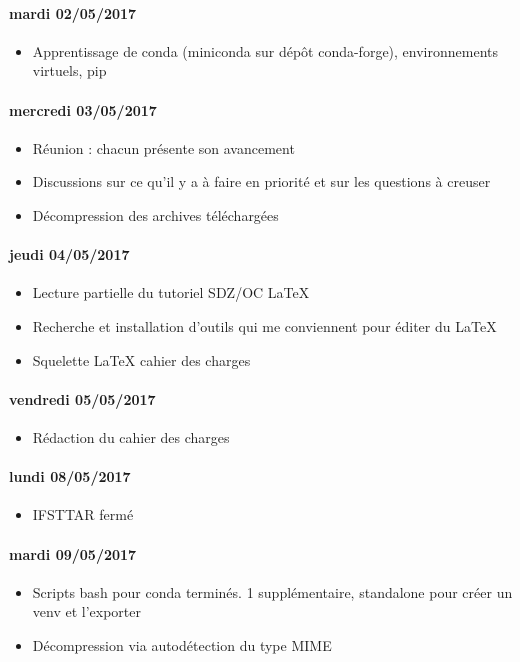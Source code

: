 \paragraph{mardi 02/05/2017}
\begin{itemize}
  \item Apprentissage de conda (miniconda sur dépôt conda-forge), environnements virtuels, pip
\end{itemize}

\paragraph{mercredi 03/05/2017}
\begin{itemize}
  \item Réunion : chacun présente son avancement
  \item Discussions sur ce qu'il y a à faire en priorité et sur les questions à creuser
  \item Décompression des archives téléchargées
\end{itemize}

\paragraph{jeudi 04/05/2017}
\begin{itemize}
  \item Lecture partielle du tutoriel SDZ/OC LaTeX
  \item Recherche et installation d'outils qui me conviennent pour éditer du LaTeX
  \item Squelette LaTeX cahier des charges
\end{itemize}

\paragraph{vendredi 05/05/2017}
\begin{itemize}
  \item Rédaction du cahier des charges
\end{itemize}

\paragraph{lundi 08/05/2017}
\begin{itemize}
  \item IFSTTAR fermé
\end{itemize}

\paragraph{mardi 09/05/2017}
\begin{itemize}
  \item Scripts bash pour conda terminés. 1 supplémentaire, standalone pour créer un venv et l'exporter
  \item Décompression via autodétection du type MIME
\end{itemize}

